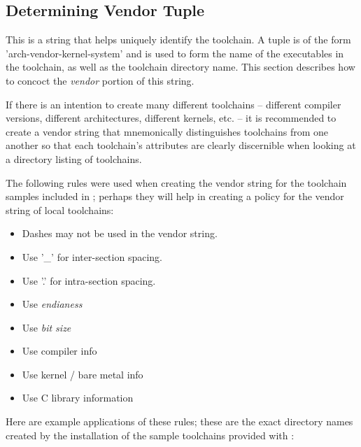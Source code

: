 \subsection{Determining Vendor Tuple}\label{toolchain-config:vendor-string}

This is a string that helps uniquely identify the toolchain.  A tuple
is of the form 'arch-vendor-kernel-system' and is used to form the
name of the executables in the toolchain, as well as the toolchain
directory name.  This section describes how to concoct the
\emph{vendor} portion of this string.

If there is an intention to create many different toolchains --
different compiler versions, different architectures, different
kernels, etc. -- it is recommended to create a vendor string that
mnemonically distinguishes toolchains from one another so that each
toolchain's attributes are clearly discernible when looking at a
directory listing of toolchains.

The following rules were used when creating the vendor string for the
toolchain samples included in \lmsbw; perhaps they will help in
creating a policy for the vendor string of local toolchains:

\begin{itemize}
\item{Dashes may not be used in the vendor string.}
\item{Use '\_' for inter-section spacing.}
\item{Use '.' for intra-section spacing.}
\item{Use \emph{endianess}}
\item{Use \emph{bit size}}
\item{Use compiler info}
\item{Use kernel / bare metal info}
\item{Use C library information}
\end{itemize}

Here are example applications of these rules; these are the exact
directory names created by the installation of the sample toolchains
provided with \lmsbw:


